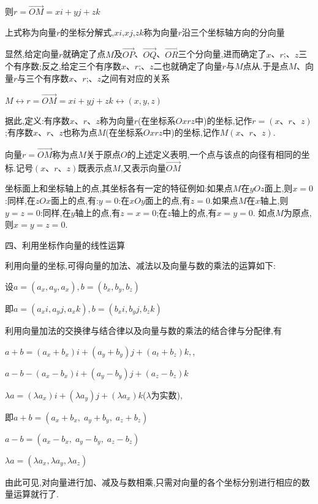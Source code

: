 \documentclass[oneside]{book}
\begin{document}
则$r = \overrightarrow {OM}  = xi + yj + zk$

上式称为向量$r$的坐标分解式,$xi$,$xj$,$zk$称为向量$r$沿三个坐标轴方向的分向量

显然,给定向量$r$就确定了点$M$及$\overrightarrow {OP} $、$\overrightarrow {OQ} $、$\overrightarrow {OR} $三个分向量,进而确定了$x$、$r$;、$z$三个有序数;反之,给定三个有序数$x$、$r$;、$z$二也就确定了向量$r$与$M$点从.于是点$M$、向量$r$与三个有序数$x$、$r$;、$z$之间有对应的关系

$M \leftrightarrow r = \overrightarrow {OM}  = xi + yj + zk \leftrightarrow \left( {x,y,z} \right)$

据此,定义:有序数$x$、$r$、$z$称为向量$r$(在坐标系$Oxrz$中)的坐标,记作$r=(x 、r、z)$;有序数$x、r、z$也称为点$M$(在坐标系$Oxrz$中)的坐标,记作$M(x、r、z)$.

向量$r = \overrightarrow {OM} $称为点$M$关于原点$O$的上述定义表明,一个点与该点的向径有相同的坐标.记号$(x、r、z)$既表示点$M$,又表示向量$\overrightarrow {OM} $

坐标面上和坐标轴上的点,其坐标各有一定的特征例如:如果点$M$在$yOz$面上,则$x=0$:同样,在$zOx$面上的点,有:$y=0$:在$xOy$面上的点,有$z=0$.如果点$M$在$x$轴上,则$y=z=0$:同样,在$y$轴上的点,有$z=x=0$;在$z$轴上的点,有$x=y=0$.
如点$M$为原点,则$x=y=z=0$.

四、利用坐标作向量的线性运算

利用向量的坐标,可得向量的加法、减法以及向量与数的乘法的运算如下:

设$a = \left( {{a_x},{a_y},{a_x}} \right),b = ({b_x},{b_y},{b_z})$

即$a = \left( {{a_x}i,{a_y}j,{a_x}k} \right),b = ({b_x}i,{b_y}j,{b_z}k)$

利用向量加法的交换律与结合律以及向量与数的乘法的结合律与分配律,有

$a + b = \left( {{a_x} + {b_x}} \right)i + \left( {{a_y} + {b_y}} \right)j + \left( {{a_t} + {b_z}} \right)k,$,

$a - b - \left( {{a_x} - {b_x}} \right)i + \left( {{a_y} - {b_y}} \right)j + \left( {{a_z} - {b_z}} \right)k$

$\lambda a = (\lambda {a_x})i + (\lambda {a_y})j + (\lambda {a_x})k$($\lambda $为实数),

即$a + b = ({a_x} + {b_x},\;{a_y} + {b_y},\;{a_z} + {b_z})$

$a - b = ({a_x} - {b_x},\;{a_y} - {b_y},\;{a_z} - {b_z})$

$\lambda a = \left( {\lambda {a_x},\lambda {a_y},\lambda {a_z}} \right)$

由此可见,对向量进行加、减及与数相乘,只需对向量的各个坐标分别进行相应的数量运算就行了.
\end{document}
